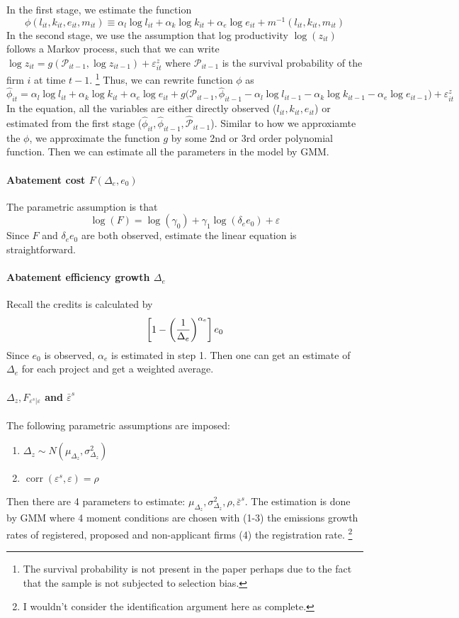 \documentclass[12pt]{article}[margin=1in]
\begin{document}
In the first stage, we estimate the function
$$\phi(l_{it}, k_{it}, e_{it}, m_{it}) \equiv \alpha_l \log l_{it} + \alpha_k \log k_{it} + \alpha_e \log e_{it} + m^{-1}(l_{it}, k_{it}, m_{it})$$
In the second stage, we use the assumption that log productivity $\log(z_{it})$ follows a Markov process, such that we can write
$\log z_{it} = g(\mathcal{P}_{it-1},\log z_{it-1}) + \varepsilon_{it}^z$
where $\mathcal{P}_{it-1}$ is the survival probability of the firm $i$ at time $t-1$. \footnote{The survival probability is not present in the paper perhaps due to the fact that the sample is not subjected to selection bias.}
Thus, we can rewrite function $\phi$ as
$$\hat{\phi}_{it} = \alpha_l \log l_{it} + \alpha_k \log k_{it} + \alpha_e \log e_{it}
    + g\big(\mathcal{P}_{it-1},\hat{\phi}_{it-1} - \alpha_l \log l_{it-1} - \alpha_k \log k_{it-1} - \alpha_e \log e_{it-1}\big) + \varepsilon_{it}^z$$
In the equation, all the variables are either directly observed ($l_{it}, k_{it}, e_{it}$) or estimated from the first stage ($\hat{\phi}_{it},\hat{\phi}_{it-1},\hat{\mathcal{P}}_{it-1}$). Similar to how we approxiamte the $\phi$, we approximate the function $g$ by some 2nd or 3rd order polynomial function. Then we can estimate all the parameters in the model by GMM.

\paragraph{Abatement cost $F(\Delta_e,e_0)$}
The parametric assumption is that $$\log(F) = \log(\gamma_0) + \gamma_1 \log(\delta_e e_0) + \varepsilon$$
Since $F$ and $\delta_e e_0$ are both observed, estimate the linear equation is straightforward.
\paragraph{Abatement efficiency growth $\Delta_e$}
Recall the credits is calculated by
$$
    \left[1-\left(\frac{1}{\Delta_e}\right)^{\alpha_e}\right] e_0
$$
Since $e_0$ is observed, $\alpha_e$ is estimated in step 1. Then one can get an estimate of $\Delta_e$ for each project and get a weighted average.

\paragraph{$\Delta_z,F_{\varepsilon^s|\varepsilon}$ and $\bar{\varepsilon}^s$}
The following parametric assumptions are imposed:
\begin{enumerate}
    \item $\Delta_z \sim N(\mu_{\Delta_z},\sigma_{\Delta_z}^2)$
    \item $\operatorname{corr}(\varepsilon^s,\varepsilon) = \rho$
\end{enumerate}
Then there are 4 parameters to estimate: $\mu_{\Delta_z},\sigma_{\Delta_z}^2,\rho,\bar{\varepsilon}^s$. The estimation is done by GMM where 4 moment conditions are chosen with (1-3) the emissions growth rates of registered, proposed and non-applicant firms (4) the registration rate. \footnote{I wouldn't consider the identification argument here as complete.}


\end{document}
